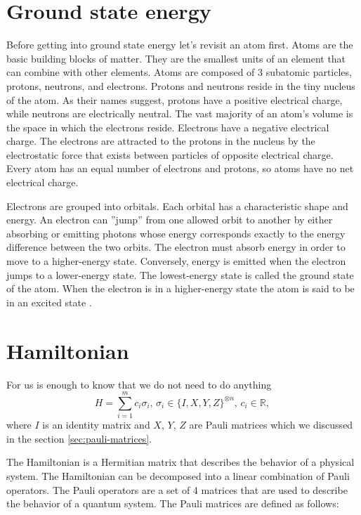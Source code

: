 \section{Ground state energy}
Before getting into ground state energy let's revisit an atom first. Atoms are the basic building blocks of matter. They are the smallest units of an element that can combine with other elements. Atoms are composed of 3 subatomic particles, protons, neutrons, and electrons. Protons and neutrons reside in the tiny nucleus of the atom. As their names suggest, protons have a positive electrical charge, while neutrons are electrically neutral. The vast majority of an atom's volume is the space in which the electrons reside. Electrons have a negative electrical charge. The electrons are attracted to the protons in the nucleus by the electrostatic force that exists between particles of opposite electrical charge. Every atom has an equal number of electrons and protons, so atoms have no net electrical charge.


Electrons are grouped into orbitals. Each orbital has a characteristic shape and energy. An electron can ''jump'' from one allowed orbit to another by either absorbing or emitting photons whose energy corresponds exactly to the energy difference between the two orbits. The electron must absorb energy in order to move to a higher-energy state. Conversely, energy is emitted when the electron jumps to a lower-energy state. The lowest-energy state is called the
ground state of the atom. When the electron is in a higher-energy state the atom is said to be in an excited state \cite{chemistry}.

\section{Hamiltonian}
For us is enough to know that we do not need to do anything 
$$H = \sum_{i=1}^{m}c_i\sigma_i \text{, } \sigma_i \in \{I, X, Y, Z\}^{\otimes n}\text{, } c_i \in \mathbb{R} \text{, }$$ 
where $I$ is an identity matrix and $X$, $Y$, $Z$ are Pauli matrices which we discussed in the section \ref{sec:pauli-matrices}. 

The Hamiltonian is a Hermitian matrix that describes the behavior of a physical system. The Hamiltonian can be decomposed into a linear combination of Pauli operators. The Pauli operators are a set of 4 matrices that are used to describe the behavior of a quantum system. The Pauli matrices are defined as follows:


\\
\\
\\
\\
